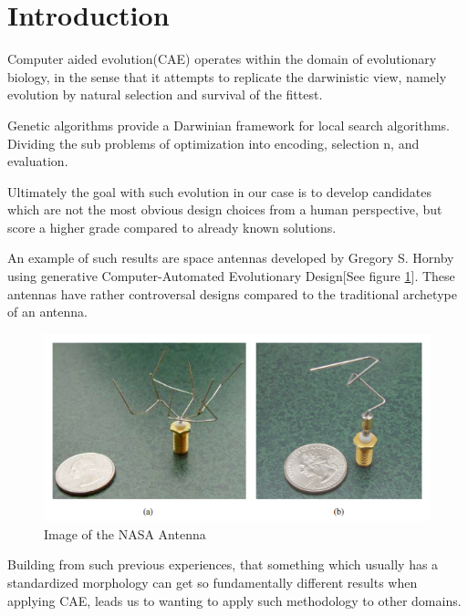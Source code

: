 \section{Introduction}
Computer aided evolution(CAE) operates within the domain of evolutionary biology, in the sense that it attempts to replicate the darwinistic view, namely evolution by natural selection and survival of the fittest\cite{paper:ev3}.

Genetic algorithms provide a Darwinian framework for local search algorithms.
Dividing the sub problems of optimization into encoding, selection
n, and evaluation\cite{paper:ev3}.

Ultimately the goal with such evolution in our case is to develop candidates
which are not the most obvious design choices from a human perspective, but
score a higher grade compared to already known solutions.

An example of such results are space antennas developed by Gregory S. Hornby\cite{paper:ev4} using generative Computer-Automated Evolutionary Design[See figure \ref{fig:nasa_antenna}].
These antennas have rather controversal designs compared to the traditional archetype of an antenna.

\begin{figure}[ht]
\includegraphics[scale=.7]{content/img/space_antenna}
\caption{Image of the NASA Antenna \cite{paper:ev4} }
\label{fig:nasa_antenna}
\end{figure}

Building from such previous experiences, that something which usually has a standardized morphology can get so fundamentally different results when applying CAE, leads us to wanting to apply such methodology to other domains.

